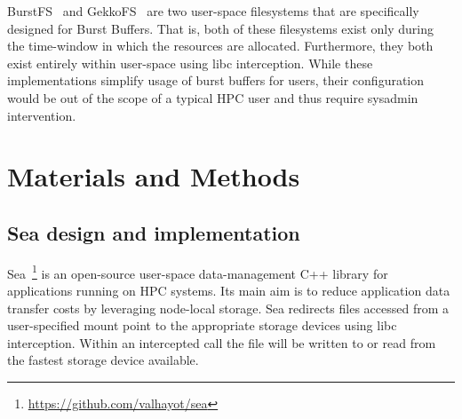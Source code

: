       BurstFS~\cite{burstfs} and GekkoFS~\cite{gekkofs} are two user-space
      filesystems that are specifically designed for Burst Buffers. That is,
      both of these filesystems exist only during the time-window in which the
      resources are allocated. Furthermore, they both exist entirely within
      user-space using libc interception. While these implementations simplify
      usage of burst buffers for users, their configuration would be out of the
      scope of a typical HPC user and thus require sysadmin intervention.

\section{Materials and Methods}

\subsection{Sea design and implementation}

Sea~\footnote{\url{https://github.com/valhayot/sea}} is an open-source user-space data-management C++ library for applications running on HPC
systems. Its main aim is to reduce application data transfer costs by leveraging
node-local storage. Sea redirects files accessed from a user-specified mount
point to the appropriate storage devices using libc interception. Within an
intercepted call the file will be written to or read from the fastest storage
device available. 


